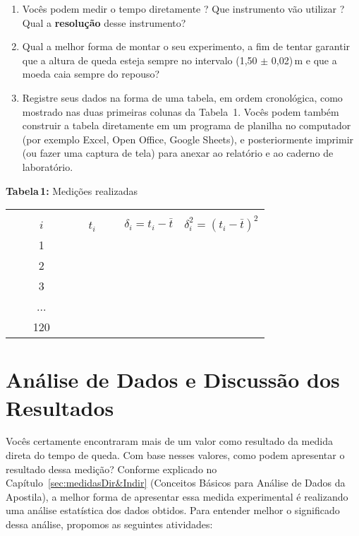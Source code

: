 \begin{enumerate}
\item Vocês podem medir o tempo diretamente ? Que instrumento vão utilizar ? Qual a {\bf resolução} desse instrumento?
\item Qual a melhor forma de montar o seu experimento, a fim de tentar garantir que a altura de queda esteja sempre no intervalo (1,50 $\pm$ 0,02)$\,$m e que a moeda caia sempre do repouso?

\item Registre seus dados na forma de uma tabela, em ordem cronológica, como mostrado nas duas primeiras colunas da Tabela~1. Vocês podem também construir a tabela diretamente em um programa de planilha no computador (por exemplo Excel, Open Office, Google Sheets), e posteriormente imprimir (ou fazer uma captura de tela) para anexar ao relatório e ao caderno de laboratório.
\end{enumerate}

\begin{center}
{{\bf Tabela\,1:} Medições realizadas}\vspace{0.2cm}

  \begin{tabular}[m]{ l | c | c | c | c |}
   \cline{2-5}
    &   & &  &  \\
    &  ~~~$i$~~~ & ~~~$t_i$~~~ & $\delta_i = t_i - \bar{t}$ & $\delta_i^2 = (t_i - \bar{t})^2$ \\\cline{2-5}
   & 1 & & & \\
   & 2 & & & \\
   & 3 & & & \\
   & ... & & & \\
    &  120& & &  \\ \cline{2-5}
  \end{tabular}
  \label{tab:Integ}
\end{center}


\section{Análise de Dados e Discussão dos Resultados}
Vocês certamente encontraram mais de um valor como resultado da medida direta do tempo de queda. Com base nesses valores, como podem apresentar o resultado dessa medição? Conforme explicado no %
Capítulo~\ref{sec:medidasDir&Indir}  (Conceitos Básicos para Análise de Dados da Apostila), a melhor forma de apresentar essa medida experimental é realizando uma análise estatística dos dados obtidos. Para entender melhor o significado dessa análise, propomos as seguintes atividades:

